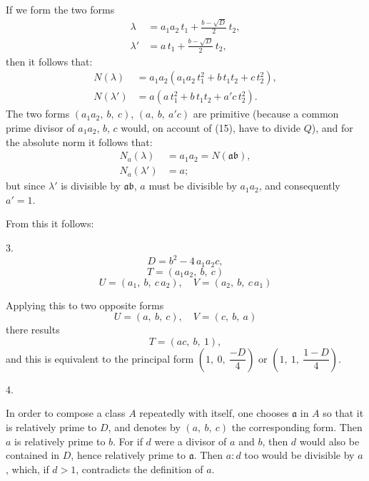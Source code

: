 If we form the two forms
\[
\begin{aligned}
\lambda &= a_1 a_2\,t_1 + \frac{b-\sqrt D}{2}\,t_2, \\
\lambda' &= a\,t_1 + \frac{b-\sqrt D}{2}\,t_2,
\end{aligned}
\]
then it follows that:
\[
\begin{aligned}
N(\lambda) &= a_1 a_2 (a_1 a_2\,t_1^2 + b\,t_1 t_2 + c\,t_2^2), \\
N(\lambda') &= a (a\,t_1^2 + b\,t_1 t_2 + a'c\,t_2^2).
\end{aligned}
\]
The two forms $(a_1 a_2,\ b,\ c)$, $(a,\ b,\ a'c)$ are primitive (because a common prime divisor of $a_1 a_2$, $b$, $c$ would, on account of (15), have to divide $Q$), and for the absolute norm it follows that:
\[
\begin{aligned}
N_a(\lambda) &= a_1 a_2 = N(\mathfrak{a}\mathfrak{b}), \\
N_a(\lambda') &= a;
\end{aligned}
\]
but since $\lambda'$ is divisible by $\mathfrak{a}\mathfrak{b}$, $a$ must be divisible by $a_1 a_2$, and consequently $a'=1$.

From this it follows:

3. 
\[
D = b^2 - 4\,a_1 a_2 c,
\]
\[
T = (a_1 a_2,\ b,\ c)
\]
\[
U = (a_1,\ b,\ c\,a_2), \quad V = (a_2,\ b,\ c\,a_1)
\]

Applying this to two opposite forms
\[
U = (a,\ b,\ c), \quad V = (c,\ b,\ a)
\]
there results
\[
T = (ac,\ b,\ 1),
\]
and this is equivalent to the principal form $\left(1,\ 0,\ \dfrac{-D}{4}\right)$ or $\left(1,\ 1,\ \dfrac{1-D}{4}\right)$.

4. 

In order to compose a class $A$ repeatedly with itself, one chooses $\mathfrak{a}$ in $A$ so that it is relatively prime to $D$, and denotes by $(a,\ b,\ c)$ the corresponding form. Then $a$ is relatively prime to $b$. For if $d$ were a divisor of $a$ and $b$, then $d$ would also be contained in $D$, hence relatively prime to $\mathfrak{a}$. Then $a:d$ too would be divisible by $a$, which, if $d>1$, contradicts the definition of $a$.
